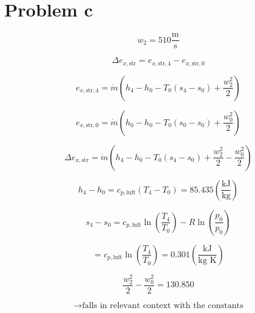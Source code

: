 \section*{Problem c}

\[
w_2 = 510 \frac{\text{m}}{\text{s}}
\]

\[
\Delta e_{x, \text{str}} = e_{x, \text{str}, 4} - e_{x, \text{str}, 0}
\]

\[
e_{x, \text{str}, 4} = \dot{m} \left( h_4 - h_0 - T_0 (s_4 - s_0) + \frac{w_2^2}{2} \right)
\]

\[
e_{x, \text{str}, 0} = \dot{m} \left( h_0 - h_0 - T_0 (s_0 - s_0) + \frac{w_0^2}{2} \right)
\]

\[
\Delta e_{x, \text{str}} = \dot{m} \left( h_4 - h_0 - T_0 (s_4 - s_0) + \frac{w_2^2}{2} - \frac{w_0^2}{2} \right)
\]

\[
h_4 - h_0 = c_{p, \text{luft}} (T_4 - T_0) = 85.435 \left( \frac{\text{kJ}}{\text{kg}} \right)
\]

\[
s_4 - s_0 = c_{p, \text{luft}} \ln \left( \frac{T_4}{T_0} \right) - R \ln \left( \frac{p_0}{p_0} \right)
\]

\[
= c_{p, \text{luft}} \ln \left( \frac{T_4}{T_0} \right) = 0.301 \left( \frac{\text{kJ}}{\text{kg K}} \right)
\]

\[
\frac{w_2^2}{2} - \frac{w_0^2}{2} = 130.850
\]

\[
\rightarrow \text{falls in relevant context with the constants}
\]
